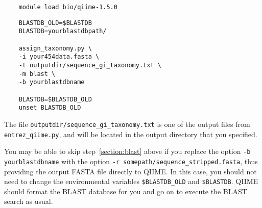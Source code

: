 \documentclass[11pt]{amsart}
\begin{document}
\begin{verbatim}
    module load bio/qiime-1.5.0
\end{verbatim}
\begin{verbatim}
    BLASTDB_OLD=$BLASTDB
    BLASTDB=yourblastdbpath/

    assign_taxonomy.py \
    -i your454data.fasta \
    -t outputdir/sequence_gi_taxonomy.txt \
    -m blast \
    -b yourblastdbname

    BLASTDB=$BLASTDB_OLD
    unset BLASTDB_OLD
\end{verbatim}

The file \verb|outputdir/sequence_gi_taxonomy.txt| is one of the output files from \verb|entrez_qiime.py|, and will be located in the output directory that you specified.

You may be able to skip step~\ref{section:blast} above if you replace the option \verb|-b yourblastdbname| with the option \verb|-r somepath/sequence_stripped.fasta|, thus providing the output FASTA file directly to QIIME. In this case, you should not need to change the environmental variables \verb|$BLASTDB_OLD| and \verb|$BLASTDB|. QIIME should format the BLAST database for you and go on to execute the BLAST search as usual.
\end{document}

